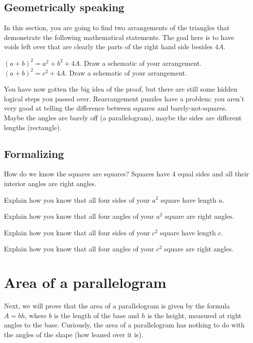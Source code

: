 \documentclass{handout}
\begin{document}
\subsection{Geometrically speaking}
In this section, you are going to find two arrangements of the triangles that demonstrate the following mathematical statements. The goal here is to have voids left over that are clearly the parts of the right hand side besides $4A$.
\begin{questions}
    \question $(a+b)^2 = a^2 +b^2 + 4 A$. Draw a schematic of your arrangement.
    \vspace{1in}
    \question $(a+b)^2 = c^2 + 4 A$. Draw a schematic of your arrangement.
    \vspace{1in}
\end{questions}
You have now gotten the big idea of the proof, but there are still some hidden logical steps you passed over. Rearrangement puzzles have a problem: you aren't very good at telling the difference between squares and barely-not-squares. Maybe the angles are barely off (a parallelogram), maybe the sides are different lengths (rectangle). 

\subsection{Formalizing}

How do we know the squares are squares? Squares have 4 equal sides and all their interior angles are right angles.

\begin{questions}
    \question Explain how you know that all four sides of your $a^2$ square have length $a$. 
    \vspace{1in}

    \question Explain how you know that all four angles of your $a^2$ square are right angles.
    \vspace{1in}

    \question Explain how you know that all four sides of your $c^2$ square have length $c$. 
    \vspace{1in}

    \question Explain how you know that all four angles of your $c^2$ square are right angles.
    \vspace{1in}

\end{questions}

\section{Area of a parallelogram}
Next, we will prove that the area of a parallelogram is given by the formula $A = b h$, where $b$ is the length of the base and $h$ is the height, measured at right angles to the base. Curiously, the area of a parallelogram has nothing to do with the angles of the shape (how leaned over it is).
\end{document}
